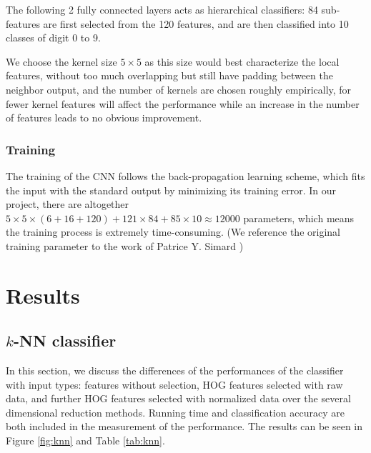 \documentclass[12pt]{article}
\begin{document}
The following 2 fully connected layers acts as hierarchical classifiers: 84 sub-features are first selected from the 120 features, and are then classified into 10 classes of digit 0 to 9.

We choose the kernel size  $5\times 5$ as this size would best characterize the local features, without too much overlapping but still have padding between the neighbor output, and the number of kernels are chosen roughly empirically, for fewer kernel features will affect the performance while  an increase in the number of features leads to no obvious improvement. 


\subsubsection{Training}

The training of the CNN follows the back-propagation learning scheme\cite{lecun1989backpropagation}, which fits the input with the standard output by minimizing its training error.
In our project, there are altogether $5\times 5\times(6+16+120)+121\times84+85\times10 \approx 12000$ parameters, which means the training process is extremely time-consuming. 
(We reference the original training parameter to the work of Patrice Y. Simard \cite{simard2003best})


\section{Results}
\label{sec:res}

\subsection{$k$-NN classifier}
In this section, we discuss the differences of the performances of the classifier with input types: features without selection, HOG features selected with raw data, and further HOG features selected with normalized data over the several dimensional reduction methods. Running time and classification accuracy are both included in the measurement of the performance. The results can be seen in Figure \ref{fig:knn} and Table \ref{tab:knn}.
\end{document}
